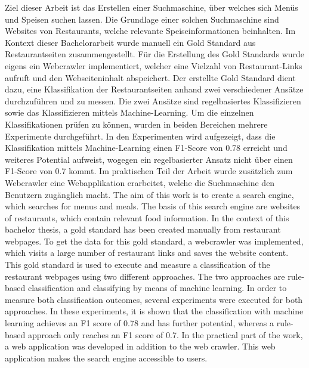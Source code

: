 Ziel dieser Arbeit ist das Erstellen einer Suchmaschine, über welches sich Menüs und Speisen suchen lassen.
Die Grundlage einer solchen Suchmaschine sind Websites von Restaurants, welche relevante Speiseinformationen beinhalten.
Im Kontext dieser Bachelorarbeit wurde manuell ein Gold Standard aus Restaurantseiten zusammengestellt.
Für die Erstellung des Gold Standards wurde eigens ein Webcrawler implementiert, welcher eine Vielzahl von Restaurant-Links aufruft und den Webseiteninhalt abspeichert.
Der erstellte Gold Standard dient dazu, eine Klassifikation der Restaurantseiten anhand zwei verschiedener Ansätze durchzuführen und zu messen.
Die zwei Ansätze sind regelbasiertes Klassifizieren sowie das Klassifizieren mittels Machine-Learning.
Um die einzelnen Klassifikationen prüfen zu können, wurden in beiden Bereichen mehrere Experimente durchgeführt.
In den Experimenten wird aufgezeigt, dass die Klassifikation mittels Machine-Learning einen F1-Score von 0.78 erreicht und weiteres Potential aufweist, wogegen ein regelbasierter Ansatz nicht über einen F1-Score von 0.7 kommt.
Im praktischen Teil der Arbeit wurde zusätzlich zum Webcrawler eine Webapplikation erarbeitet, welche die Suchmaschine den Benutzern zugänglich macht.
The aim of this work is to create a search engine, which searches for menus and meals.
The basis of this search engine are websites of restaurants, which contain relevant food information.
In the context of this bachelor thesis, a gold standard has been created manually from restaurant webpages.
To get the data for this gold standard, a webcrawler was implemented, which visits a large number of restaurant links and saves the website content.
This gold standard is used to execute and measure a classification of the restaurant webpages using two different approaches.
The two approaches are rule-based classification and classifying by means of machine learning.
In order to measure both classification outcomes, several experiments were executed for both approaches.
In these experiments, it is shown that the classification with machine learning achieves an F1 score of 0.78 and has further potential, whereas a rule-based approach only reaches an F1 score of 0.7.
In the practical part of the work, a web application was developed in addition to the web crawler.
This web application makes the search engine accessible to users.
